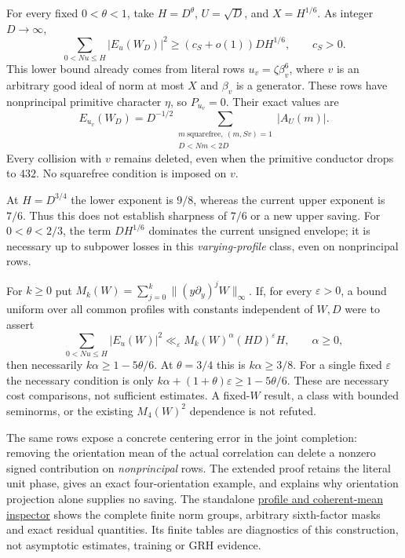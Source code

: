 \begin{proposition}\label{prf:lower}
For every fixed $0<\theta<1$, take $H=D^\theta$, $U=\sqrt D$, and
$X=H^{1/6}$. As integer $D\to\infty$,
\begin{equation}\label{prf:lower-bound}
 \sum_{0<Nu\le H}|E_u(W_D)|^2\ge(c_S+o(1))DH^{1/6},\qquad c_S>0.
\end{equation}
This lower bound already comes from literal rows
$u_v=\zeta\beta_v^6$, where $v$ is an arbitrary good ideal of norm at most
$X$ and $\beta_v$ is a generator. These rows have nonprincipal primitive
character $\eta$, so $P_{u_v}=0$. Their exact values are
\begin{equation}\label{prf:row}
 E_{u_v}(W_D)=D^{-1/2}
 \sum_{\substack{m\ \mathrm{squarefree},\ (m,Sv)=1\\D<Nm<2D}}
                      |A_U(m)|.
\end{equation}
Every collision with $v$ remains deleted, even when the primitive conductor
drops to $432$. No squarefree condition is imposed on $v$.
\end{proposition}
At $H=D^{3/4}$ the lower exponent is $9/8$, whereas the current upper
exponent is $7/6$. Thus this does not establish sharpness of $7/6$ or a new
upper saving. For $0<\theta<2/3$, the term $DH^{1/6}$ dominates the current
unsigned envelope; it is necessary up to subpower losses in this
\emph{varying-profile} class, even on nonprincipal rows.

For $k\ge0$ put
$M_k(W)=\sum_{j=0}^k\|(y\partial_y)^jW\|_\infty$.
If, for every $\varepsilon>0$, a bound uniform over all common profiles
with constants independent of $W,D$ were to assert
\[
 \sum_{0<Nu\le H}|E_u(W)|^2
 \ll_\varepsilon M_k(W)^\alpha(HD)^\varepsilon H,
 \qquad \alpha\ge0,
\]
then necessarily $k\alpha\ge1-5\theta/6$. At $\theta=3/4$ this is
$k\alpha\ge3/8$. For a single fixed $\varepsilon$ the necessary condition
is only $k\alpha+(1+\theta)\varepsilon\ge1-5\theta/6$.
These are necessary cost comparisons, not sufficient estimates. A
fixed-$W$ result, a class with bounded seminorms, or the existing
$M_4(W)^2$ dependence is not refuted.

The same rows expose a concrete centering error in the joint completion:
removing the orientation mean of the actual correlation can delete a
nonzero signed contribution on \emph{nonprincipal} rows. The extended proof
retains the literal unit phase, gives an exact four-orientation example,
and explains why orientation projection alone supplies no saving. The
standalone \href{../profile-uniformity.html}{profile and coherent-mean inspector}
shows the complete finite norm groups, arbitrary sixth-factor masks and
exact residual quantities. Its finite tables are diagnostics of this
construction, not asymptotic estimates, training or GRH evidence.
